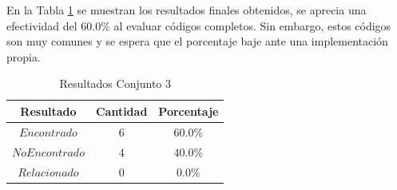 En la Tabla \ref{tab:resss3} se muestran los resultados finales obtenidos,
se aprecia una efectividad del $60.0\%$ al evaluar códigos completos.
Sin embargo, estos códigos son muy comunes y se espera que el porcentaje 
baje ante una implementación propia.

\begin{table}[H]
\caption{Resultados Conjunto 3}
\label{tab:resss3}
\centering
\begin{tabular}{ccc}
\hline
{Resultado} & {Cantidad} & {Porcentaje} \\
\hline
$Encontrado$ & $6$ & $60.0\%$ \\
$No Encontrado$ & $4$ & $40.0\%$ \\
$Relacionado$ & $0$ & $0.0\%$ \\
\hline
\end{tabular}
\end{table}


